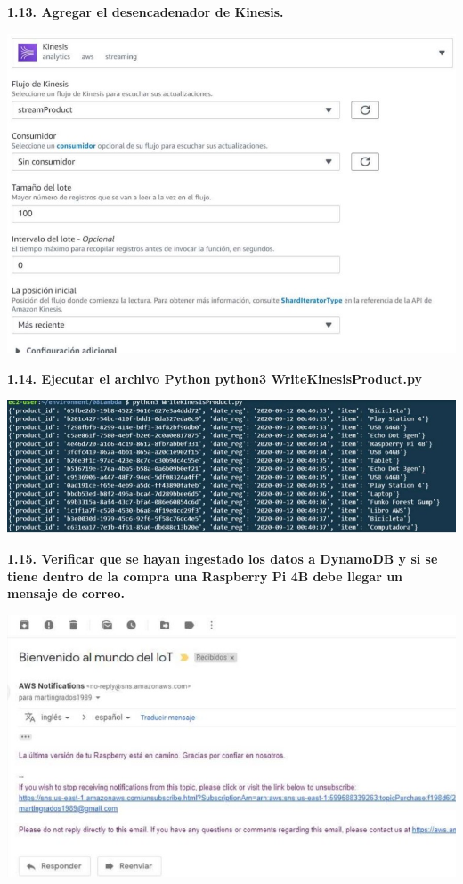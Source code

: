 \documentclass{article}
\begin{document}
	\textbf{1.13.  Agregar el desencadenador de Kinesis.
}

    \begin{center}
		\includegraphics[width=15cm]{./images/14} 
	\end{center}
	
	\textbf{1.14.  Ejecutar el archivo Python
python3 WriteKinesisProduct.py 
}

    \begin{center}
		\includegraphics[width=15cm]{./images/15} 
	\end{center}
	
	\textbf{1.15.  Verificar que se hayan ingestado los datos a DynamoDB y si se tiene dentro de la compra una
Raspberry Pi 4B debe llegar un mensaje de correo.
}

    \begin{center}
		\includegraphics[width=15cm]{./images/16} 
	\end{center}
	
\end{document}
